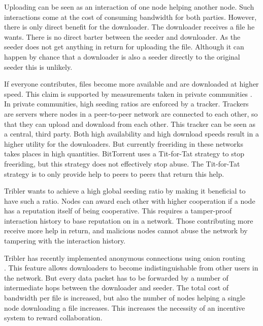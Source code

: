 Uploading can be seen as an interaction of one node helping another node.
Such interactions come at the cost of consuming bandwidth for both parties.
However, there is only direct benefit for the downloader.
The downloader receives a file he wants.
There is no direct barter between the seeder and downloader.
As the seeder does not get anything in return for uploading the file.
Although it can happen by chance that a downloader is also a seeder directly to the original seeder
this is unlikely\cite{Lai-Incentives}.

If everyone contributes, files become more available and are downloaded at higher speed.
This claim is supported by measurements taken in private communities
\cite{meulpolder-privatecommunities}.
In private communities, high seeding ratios are enforced by a tracker.
Trackers are servers where nodes in a peer-to-peer network are connected to each other,
so that they can upload and download from each other\cite{cohen-titfortat}.
This tracker can be seen as a central, third party.
Both high availability and high download speeds result in a higher utility for the downloaders.
But currently freeriding in these networks takes places in high quantities\cite{Adar-Freeriding}.
BitTorrent uses a Tit-for-Tat strategy to stop freeriding,
but this strategy does not effectively stop abuse\cite{Pouwelse-tribler}.
The Tit-for-Tat strategy is to only provide help to peers to peers that return this help\cite{cohen-titfortat}.


Tribler wants to achieve a high global seeding ratio by making it beneficial to have such a ratio.
Nodes can award each other with higher cooperation if a node has a reputation itself of being cooperative.
This requires a tamper-proof interaction history to base reputation on in a network.
Those contributing more receive more help in return,
and malicious nodes cannot abuse the network by tampering with the interaction history.

Tribler has recently implemented anonymous connections using onion routing \\\cite{Plak-anonymous}\cite{ruigrok-anonymous}.
This feature allows downloaders to become indistinguishable from other users in the network.
But every data packet has to be forwarded
by a number of intermediate hops between the downloader and seeder\cite{Plak-anonymous}.
The total cost of bandwidth per file is increased,
but also the number of nodes helping a single node downloading a file increases.
This increases the necessity of an incentive system to reward collaboration.

